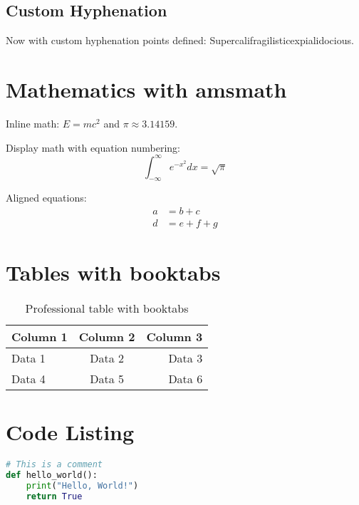 \documentclass{article}
\begin{document}
    \subsection{Custom Hyphenation}
    Now with custom hyphenation points defined: Supercalifragilisticexpialidocious.

    \section{Mathematics with amsmath}
    Inline math: $E = mc^2$ and $\pi \approx 3.14159$.

    Display math with equation numbering:
    \begin{equation}
        \int_{-\infty}^{\infty} e^{-x^2} dx = \sqrt{\pi}
    \end{equation}

    Aligned equations:
    \begin{align}
        a &= b + c \\
        d &= e + f + g
    \end{align}

    \section{Tables with booktabs}
    \begin{table}[h]
        \centering
        \caption{Professional table with booktabs}
        \begin{tabular}{lcr}
            \toprule
            \textbf{Column 1} & \textbf{Column 2} & \textbf{Column 3} \\
            \midrule
            Data 1 & Data 2 & Data 3 \\
            Data 4 & Data 5 & Data 6 \\
            \bottomrule
        \end{tabular}
    \end{table}

    \section{Code Listing}

    \begin{lstlisting}[language=Python, caption=Sample Python Code]
# This is a comment
def hello_world():
    print("Hello, World!")
    return True
    \end{lstlisting}
\end{document}
